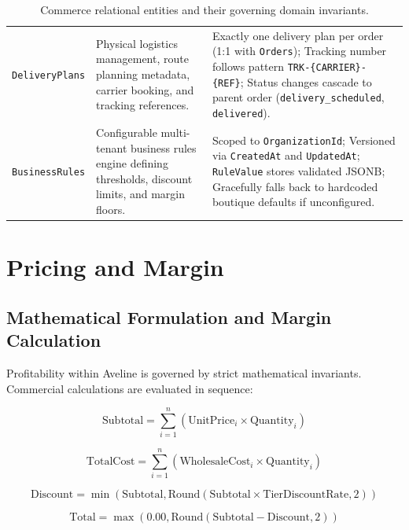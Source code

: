 \begin{table}[h!]
\begin{tabularx}{\textwidth}{l p{5cm} X}
\addlinespace
\texttt{DeliveryPlans} & Physical logistics management, route planning metadata, carrier booking, and tracking references. & Exactly one delivery plan per order (1:1 with \texttt{Orders}); Tracking number follows pattern \texttt{TRK-\{CARRIER\}-\{REF\}}; Status changes cascade to parent order (\texttt{delivery\_scheduled}, \texttt{delivered}). \\
\addlinespace
\texttt{BusinessRules} & Configurable multi-tenant business rules engine defining thresholds, discount limits, and margin floors. & Scoped to \texttt{OrganizationId}; Versioned via \texttt{CreatedAt} and \texttt{UpdatedAt}; \texttt{RuleValue} stores validated JSONB; Gracefully falls back to hardcoded boutique defaults if unconfigured. \\
\bottomrule
\end{tabularx}
\caption{Commerce relational entities and their governing domain invariants.}
\label{tab:commerce-data-model}
\end{table}

\section{Pricing and Margin}
\label{sec:c-pricing}

\subsection{Mathematical Formulation and Margin Calculation}

Profitability within Aveline is governed by strict mathematical invariants. Commercial calculations are evaluated in sequence:

\begin{equation}
\text{Subtotal} = \sum_{i=1}^{n} (\text{UnitPrice}_i \times \text{Quantity}_i)
\end{equation}

\begin{equation}
\text{TotalCost} = \sum_{i=1}^{n} (\text{WholesaleCost}_i \times \text{Quantity}_i)
\end{equation}

\begin{equation}
\text{Discount} = \min\left(\text{Subtotal}, \text{Round}(\text{Subtotal} \times \text{TierDiscountRate}, 2)\right)
\end{equation}

\begin{equation}
\text{Total} = \max\left(0.00, \text{Round}(\text{Subtotal} - \text{Discount}, 2)\right)
\end{equation}

